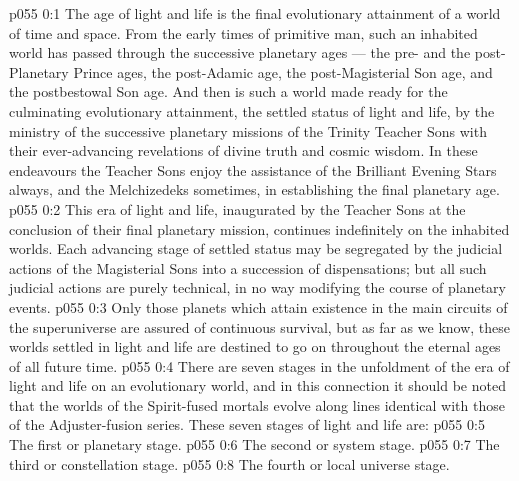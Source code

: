 \author{Mighty Messenger}
\vs p055 0:1 The age of light and life is the final evolutionary attainment of a world of time and space. From the early times of primitive man, such an inhabited world has passed through the successive planetary ages --- the pre\hyp{} and the post\hyp{}Planetary Prince ages, the post\hyp{}Adamic age, the post\hyp{}Magisterial Son age, and the postbestowal Son age. And then is such a world made ready for the culminating evolutionary attainment, the settled status of light and life, by the ministry of the successive planetary missions of the Trinity Teacher Sons with their ever\hyp{}advancing revelations of divine truth and cosmic wisdom. In these endeavours the Teacher Sons enjoy the assistance of the Brilliant Evening Stars always, and the Melchizedeks sometimes, in establishing the final planetary age.
\vs p055 0:2 This era of light and life, inaugurated by the Teacher Sons at the conclusion of their final planetary mission, continues indefinitely on the inhabited worlds. Each advancing stage of settled status may be segregated by the judicial actions of the Magisterial Sons into a succession of dispensations; but all such judicial actions are purely technical, in no way modifying the course of planetary events.
\vs p055 0:3 \pc Only those planets which attain existence in the main circuits of the superuniverse are assured of continuous survival, but as far as we know, these worlds settled in light and life are destined to go on throughout the eternal ages of all future time.
\vs p055 0:4 \pc There are seven stages in the unfoldment of the era of light and life on an evolutionary world, and in this connection it should be noted that the worlds of the Spirit\hyp{}fused mortals evolve along lines identical with those of the Adjuster\hyp{}fusion series. These seven stages of light and life are:
\vs p055 0:5 \bibnobreakspace The first or planetary stage.
\vs p055 0:6 \bibnobreakspace The second or system stage.
\vs p055 0:7 \bibnobreakspace The third or constellation stage.
\vs p055 0:8 \bibnobreakspace The fourth or local universe stage.
